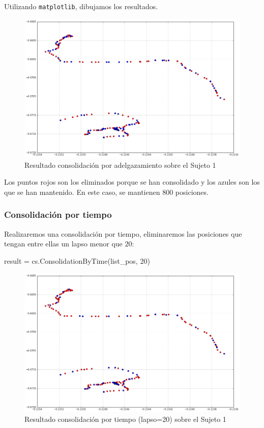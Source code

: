 \documentclass[a4paper, 12pt]{article}
\begin{document}
Utilizando \texttt{matplotlib}, dibujamos los resultados.\\

\begin{figure}[H]
	\includegraphics[scale=.45]{../comparativa/thinningSuj1.png}
	\caption{Resultado consolidaci\'on por adelgazamiento sobre el Sujeto 1}
\end{figure}

Los puntos rojos son los eliminados porque se han consolidado y los azules son los que se han mantenido. En este caso, se mantienen 800 posiciones. \\

\pagebreak
\subsubsection{Consolidaci\'on por tiempo}

Realizaremos una consolidaci\'on por tiempo, eliminaremos las posiciones que tengan entre ellas un lapso menor que $20$:

\begin{python}
result = cs.ConsolidationByTime(list_pos, 20)
\end{python}

\begin{figure}[H]
	\includegraphics[scale=.45]{../comparativa/byTimeSuj1.png}
	\caption{Resultado consolidaci\'on por tiempo (lapso=20) sobre el Sujeto 1}
\end{figure}
\end{document}

